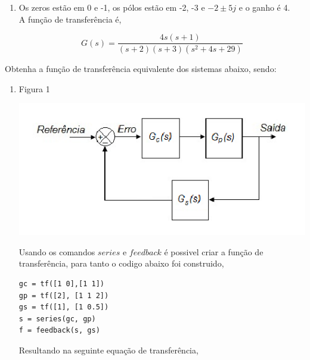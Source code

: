 \documentclass[a4paper, 10pt]{article}
\begin{document}
\begin{list}{\textbf{Questão .}}{
\setlength{\labelwidth}{-2mm} \setlength{\parsep}{0mm}
\setlength{\topsep}{0mm} \setlength{\leftmargin}{0mm}}
\begin{enumerate}
                 Usando o mesmo código usando no item a, a função de transferência fica,

                 $$
                 G(s) = \frac{s}{s^2 + 2 s + 5}
                 $$

                 

             \item
                 Os zeros estão em 0 e -1, os pólos estão em -2, -3 e 
                 $-2\pm5j$ e o ganho é 4.\\

                 A função de transferência é,

                 $$
                 G(s) = \frac{4 s (s+1)}{(s+2) (s+3) (s^2 + 4 s + 29)}
                 $$
                

        \end{enumerate}


\newpage
    Obtenha a função de transferência equivalente dos sistemas abaixo, sendo:

    \begin{enumerate}
        \item
            Figura 1
            \begin{center}
            \includegraphics[scale=0.5]{fig5a.png}
            \end{center}

            Usando os comandos $series$ e $feedback$ é possivel criar a função
            de transferência, para tanto o codigo abaixo foi construido,

            \begin{lstlisting}
gc = tf([1 0],[1 1])
gp = tf([2], [1 1 2])
gs = tf([1], [1 0.5])
s = series(gc, gp)
f = feedback(s, gs)
             \end{lstlisting}

            Resultando na seguinte equação de transferência,


\end{enumerate}
\end{list}
\end{document}
